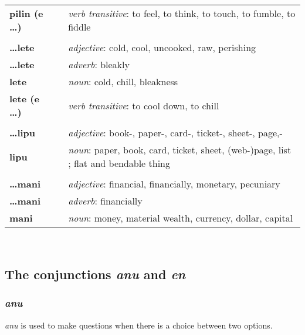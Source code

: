 \begin{supertabular}{p{2,5cm}|ll}
\textbf{pilin (e \dots)} && \textit{verb transitive}: to feel, to think, to touch, to fumble, to fiddle \\ %
 && \\ %
\textbf{\dots lete} && \textit{adjective}: cold, cool, uncooked, raw, perishing \\ %
\textbf{\dots lete} && \textit{adverb}: bleakly \\ %
\textbf{lete} && \textit{noun}: cold, chill, bleakness \\ %
\textbf{lete (e \dots)} && \textit{verb transitive}: to cool down, to chill \\ %
 && \\ %
\textbf{\dots lipu} && \textit{adjective}: book-, paper-, card-, ticket-, sheet-, page,- \\ %
\textbf{lipu} && \textit{noun}: paper, book, card, ticket, sheet, (web-)page, list ; flat and bendable thing \\ %
 && \\ %
\textbf{\dots mani} && \textit{adjective}: financial, financially, monetary, pecuniary \\ %
\textbf{\dots mani} && \textit{adverb}: financially \\ %
\textbf{mani} && \textit{noun}: money, material wealth, currency, dollar, capital \\ %
\end{supertabular} \\
% 
\subsection*{The conjunctions \textit{anu} and \textit{en}}
%
\subsubsection*{\textit{anu}}
%
\textit{anu} is used to make questions when there is a choice between two options. 

